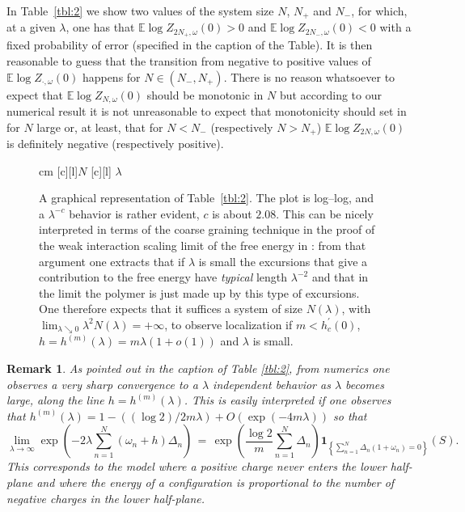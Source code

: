 \documentclass[reqno,11pt]{amsart}
\numberwithin{equation}{section}
\newtheorem{rem}[theorem]{Remark}
\newcommand{\ind}{\mathbf{1}}
\newcommand{\bbE}{{\ensuremath{\mathbb E}} }
\newcommand{\go}{\omega}
\newcommand{\gl}{\lambda}
\begin{document}
In Table~\ref{tbl:2} we show
two values of the system size $N$,  $N_+$ and $N_-$,
for which, at a given $\gl$, one has that
$\bbE\log Z_{2N_+, \go}(0)> 0$ and  $\bbE\log Z_{2N_-, \go}(0)< 0$
with a fixed probability of error (specified in the caption of the Table).
It is then reasonable to guess that the transition from
negative to positive values of $\bbE\log Z_{\cdot , \go}(0)$ happens
for $N\in (N_-,N_+)$. There is no reason whatsoever to expect that
 $\bbE\log Z_{N, \go}(0)$ should be monotonic in $N$ but according to our numerical result it is not unreasonable to expect that monotonicity should set in for $N$ large or, at least, that for $N< N_-$ (respectively $N>N_+$)
 $\bbE\log Z_{2N, \go}(0)$ is definitely negative
(respectively positive).

\begin{figure}[h]
\begin{center}
\leavevmode
{} cm
\psfragscanon
{}[c][l]{$N$}
[c][l]{ $\gl$}
\end{center}
\caption{\label{fig:NCA} A graphical representation  of
Table~\ref{tbl:2}. The plot is log--log, and a $\gl^{-c}$ behavior is rather
evident, $c$ is about $2.08$. This can be nicely interpreted in terms
of the coarse graining technique in the proof of the weak interaction scaling
limit of the free energy in \cite{cf:BdH}: from that argument one extracts that
if $\gl $ is small the excursions that give a contribution to the free
energy have {\sl typical} length $\gl^{-2}$ and that
in the limit the polymer is just made up by this type of excursions.
One therefore  expects
that it suffices a system of size $N(\gl)$, with $\lim_{\gl \searrow 0} \gl^2 N(\gl)=+\infty$,
to observe localization if $m<h_c^\prime( 0)$, $h=h^{(m)}(\gl)= m \gl (1+o(1))$ and $\gl$ is small.}
\end{figure}


\begin{rem}
\label{rem:starstar}
\rm
As pointed out in the caption of Table  \ref{tbl:2}, from numerics one observes
a very sharp convergence to a $\gl$ independent behavior as $\gl$
becomes large, along the line $h=h^{(m)}(\gl)$.
This is easily interpreted if one observes that $h^{(m)}(\gl)= 1-((\log 2) /2m\gl)+O(\exp(-4m\gl))$
so that
\begin{equation}
\label{eq:lim_mod}
\lim_{\gl \to \infty} \exp\left(-2 \gl \sum_{n=1}^N
\left( \go_n +h\right) \Delta_n \right)\, =\, \exp\left(\frac{\log 2}{m}\sum_{n=1}^N \Delta_n\right)
\ind_{\left\{\sum_{n=1}^N \Delta_n (1+\go_n)=0\right\} } (S).
\end{equation}
This corresponds to the model where a positive charge never enters the lower half-plane and where the energy of a configuration is proportional to the number of negative charges in the lower half-plane.
\end{rem}
\end{document}
